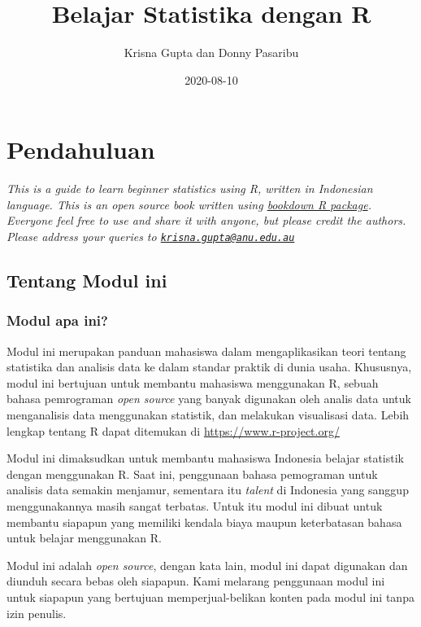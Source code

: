 \documentclass[
]{book}
\title{Belajar Statistika dengan R}
\author{Krisna Gupta dan Donny Pasaribu}
\date{2020-08-10}
\begin{document}
\maketitle

{
\setcounter{tocdepth}{1}
\tableofcontents
}
\hypertarget{pendahuluan}{%
\chapter{Pendahuluan}\label{pendahuluan}}

\emph{This is a guide to learn beginner statistics using R, written in Indonesian language. This is an open source book written using \href{https://bookdown.org/yihui/bookdown/}{bookdown R package}. Everyone feel free to use and share it with anyone, but please credit the authors. Please address your queries to \href{mailto:krisna.gupta@anu.edu.au}{\nolinkurl{krisna.gupta@anu.edu.au}}}

\hypertarget{tentang-modul-ini}{%
\section{Tentang Modul ini}\label{tentang-modul-ini}}

\hypertarget{modul-apa-ini}{%
\subsection{Modul apa ini?}\label{modul-apa-ini}}

Modul ini merupakan panduan mahasiswa dalam mengaplikasikan teori tentang statistika dan analisis data ke dalam standar praktik di dunia usaha. Khususnya, modul ini bertujuan untuk membantu mahasiswa menggunakan R, sebuah bahasa pemrograman \emph{open source} yang banyak digunakan oleh analis data untuk menganalisis data menggunakan statistik, dan melakukan visualisasi data. Lebih lengkap tentang R dapat ditemukan di \url{https://www.r-project.org/}

Modul ini dimaksudkan untuk membantu mahasiswa Indonesia belajar statistik dengan menggunakan R. Saat ini, penggunaan bahasa pemograman untuk analisis data semakin menjamur, sementara itu \emph{talent} di Indonesia yang sanggup menggunakannya masih sangat terbatas. Untuk itu modul ini dibuat untuk membantu siapapun yang memiliki kendala biaya maupun keterbatasan bahasa untuk belajar menggunakan R.

Modul ini adalah \emph{open source}, dengan kata lain, modul ini dapat digunakan dan diunduh secara bebas oleh siapapun. Kami melarang penggunaan modul ini untuk siapapun yang bertujuan memperjual-belikan konten pada modul ini tanpa izin penulis.
\end{document}
